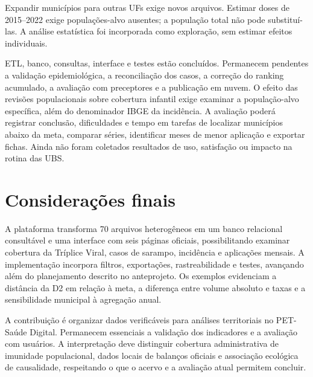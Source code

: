\documentclass[12pt]{article}
\begin{document}
Expandir municípios para outras UFs exige novos arquivos. Estimar doses de 2015--2022 exige populações-alvo ausentes; a população total não pode substituí-las. A análise estatística foi incorporada como exploração, sem estimar efeitos individuais.

ETL, banco, consultas, interface e testes estão concluídos. Permanecem pendentes a validação epidemiológica, a reconciliação dos casos, a correção do ranking acumulado, a avaliação com preceptores e a publicação em nuvem. O efeito das revisões populacionais sobre cobertura infantil exige examinar a população-alvo específica, além do denominador IBGE da incidência. A avaliação poderá registrar conclusão, dificuldades e tempo em tarefas de localizar municípios abaixo da meta, comparar séries, identificar meses de menor aplicação e exportar fichas. Ainda não foram coletados resultados de uso, satisfação ou impacto na rotina das UBS.

\section{Considerações finais}
A plataforma transforma 70 arquivos heterogêneos em um banco relacional consultável e uma interface com seis páginas oficiais, possibilitando examinar cobertura da Tríplice Viral, casos de sarampo, incidência e aplicações mensais. A implementação incorpora filtros, exportações, rastreabilidade e testes, avançando além do planejamento descrito no anteprojeto. Os exemplos evidenciam a distância da D2 em relação à meta, a diferença entre volume absoluto e taxas e a sensibilidade municipal à agregação anual.

A contribuição é organizar dados verificáveis para análises territoriais no PET-Saúde Digital. Permanecem essenciais a validação dos indicadores e a avaliação com usuários. A interpretação deve distinguir cobertura administrativa de imunidade populacional, dados locais de balanços oficiais e associação ecológica de causalidade, respeitando o que o acervo e a avaliação atual permitem concluir.



\end{document}
